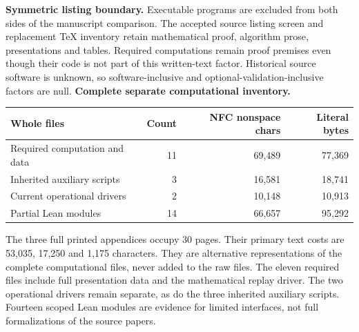 \documentclass[11pt,a4paper]{article}
\begin{document}
\textbf{Symmetric listing boundary.} Executable programs are excluded from both sides of the manuscript comparison. The accepted source listing screen and replacement TeX inventory retain mathematical proof, algorithm prose, presentations and tables. Required computations remain proof premises even though their code is not part of this written-text factor. Historical source software is unknown, so software-inclusive and optional-validation-inclusive factors are null.
\newpage
\textbf{Complete separate computational inventory.}
\begin{center}\small\begin{tabular}{lrrr}\toprule
Whole files & Count & NFC nonspace chars & Literal bytes\\\midrule
Required computation and data & 11 & 69,489 & 77,369\\
Inherited auxiliary scripts & 3 & 16,581 & 18,741\\
Current operational drivers & 2 & 10,148 & 10,913\\
Partial Lean modules & 14 & 66,657 & 95,292\\
\bottomrule\end{tabular}\end{center}
The three full printed appendices occupy 30 pages. Their primary text costs are 53,035, 17,250 and 1,175 characters. They are alternative representations of the complete computational files, never added to the raw files. The eleven required files include full presentation data and the mathematical replay driver. The two operational drivers remain separate, as do the three inherited auxiliary scripts. Fourteen scoped Lean modules are evidence for limited interfaces, not full formalizations of the source papers.
\end{document}
